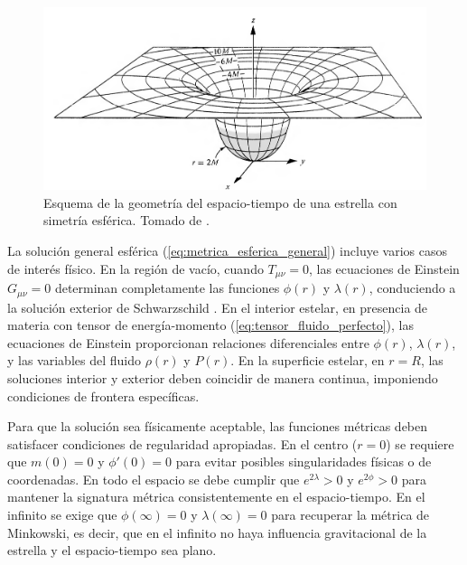 
\begin{figure}[h]
	\centering
	\includegraphics[width=0.7\linewidth]{Figuras/geometry-misner}
	\caption{Esquema de la geometría del espacio-tiempo de una estrella con simetría esférica. Tomado de \cite{misnerGravitation2017}.}
	\label{fig:geometry-misner}
\end{figure}

La solución general esférica (\ref{eq:metrica_esferica_general}) incluye varios casos de interés físico. En la región de vacío, cuando $T_{\mu\nu} = 0$, las ecuaciones de Einstein $G_{\mu\nu} = 0$ determinan completamente las funciones $\phi(r)$ y $\lambda(r)$, conduciendo a la solución exterior de Schwarzschild \cite{schwarzschildGravitationalFieldMass1999}. En el interior estelar, en presencia de materia con tensor de energía-momento (\ref{eq:tensor_fluido_perfecto}), las ecuaciones de Einstein proporcionan relaciones diferenciales entre $\phi(r)$, $\lambda(r)$, y las variables del fluido $\rho(r)$ y $P(r)$. En la superficie estelar, en $r = R$, las soluciones interior y exterior deben coincidir de manera continua, imponiendo condiciones de frontera específicas.

Para que la solución sea físicamente aceptable, las funciones métricas deben satisfacer condiciones de regularidad apropiadas. En el centro ($r = 0$) se requiere que $m(0) = 0$ y $\phi'(0) = 0$ para evitar posibles singularidades físicas o de coordenadas. En todo el espacio se debe cumplir que $e^{2\lambda} > 0$ y $e^{2\phi} > 0$ para mantener la signatura métrica consistentemente en el espacio-tiempo. En el infinito se exige que $\phi(\infty) = 0$ y $\lambda(\infty) = 0$ para recuperar la métrica de Minkowski, es decir, que en el infinito no haya influencia gravitacional de la estrella y el espacio-tiempo sea plano.


